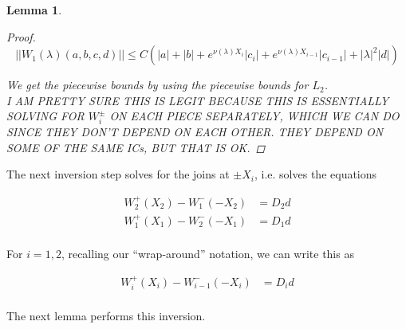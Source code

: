 \documentclass[12pt]{article}
\newtheorem{lemma}{Lemma}
\begin{document}
\begin{lemma}
\begin{proof}
\[
||W_1(\lambda)(a,b,c,d)|| \leq C (|a| + |b| + e^{\nu(\lambda)X_i}|c_i| + e^{\nu(\lambda)X_{i-1}}|c_{i-1}| + |\lambda|^2 |d| )
\]

We get the piecewise bounds by using the piecewise bounds for $L_2$. \\

I AM PRETTY SURE THIS IS LEGIT BECAUSE THIS IS ESSENTIALLY SOLVING FOR $W_i^\pm$ ON EACH PIECE SEPARATELY, WHICH WE CAN DO SINCE THEY DON'T DEPEND ON EACH OTHER. THEY DEPEND ON SOME OF THE SAME ICs, BUT THAT IS OK.

\end{proof}
\end{lemma}

The next inversion step solves for the joins at $\pm X_i$, i.e. solves the equations

\begin{align*}
W_2^+(X_2) - W_1^-(-X_2) &= D_2 d \\
W_1^+(X_1) - W_2^-(-X_1) &= D_1 d \\
\end{align*}

For $i = 1, 2$, recalling our ``wrap-around'' notation, we can write this as

\begin{align*}
W_i^+(X_i) - W_{i-1}^-(-X_i) &= D_i d \\
\end{align*}

The next lemma performs this inversion.
\end{document}
